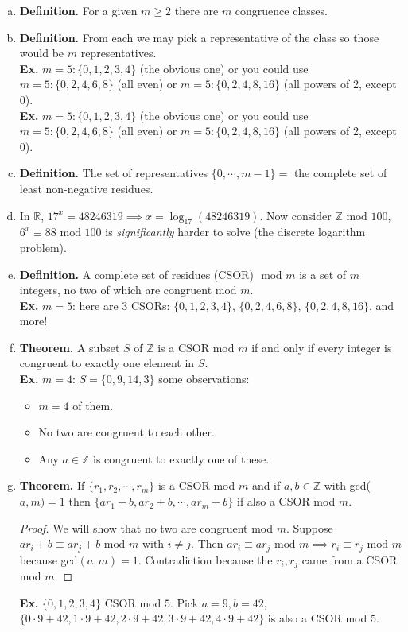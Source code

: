 \documentclass[class=article, crop=false]{standalone}
\def\reals{{\mathbb R}}
\def\integers{{\mathbb Z}}
\begin{document}
\begin{enumerate}[1.]
\begin{enumerate}[(a)]
		\item \textbf{Definition.} For a given $m\geq 2$ there are $m$ congruence classes.
		
		\item \textbf{Definition.} From each we may pick a representative of the class so those would be $m$
		representatives.\\ \textbf{Ex.} $m=5: \{0,1,2,3,4\}$ (the obvious one) or you could use $m=5: \{0,2,4,6,8\}$ (all even) 
		or $m=5:\{0,2,4,8,16\}$ (all powers of 2, except 0).\\
		\textbf{Ex.} $m=5: \{0,1,2,3,4\}$ (the obvious one) or you could use $m=5: \{0,2,4,6,8\}$ (all even) 
		or $m=5:\{0,2,4,8,16\}$ (all powers of 2, except 0).
		
		\item \textbf{Definition.} The set of representatives $\{0,\cdots,m-1\}=$ the complete set of least
		non-negative residues.

		\item[] 
		\noindent In $\reals$, $17^x = 48246319\implies x=\log_17(48246319)$. Now consider $\integers\mbox{ mod }100$,
		$6^x\equiv 88\mbox{ mod }100$ is \emph{significantly} harder to solve (the discrete logarithm problem).

		\item \textbf{Definition.} A complete set of residues (CSOR) $\mbox{ mod }m$ is a set of $m$ integers, no two of which
		are congruent mod $m$.\\
		\textbf{Ex.} $m=5$: here are 3 CSORs: $\{0,1,2,3,4\}$, $\{0,2,4,6,8\}$, $\{0,2,4,8,16\}$, and more!

		\item \textbf{Theorem.} A subset $S$ of $\integers$ is a CSOR mod $m$ if and only if every integer is
		congruent to exactly one element in $S$.\\
		\noindent\textbf{Ex.} $m=4$: $S=\{0,9,14,3\}$ some observations:
		\begin{itemize}
			\item $m=4$ of them.
			\item No two are congruent to each other.
			\item Any $a\in\integers$ is congruent to exactly one of these.
		\end{itemize}

		\item \textbf{Theorem.} If $\{r_1,r_2,\cdots, r_m\}$ is a CSOR mod $m$ and if $a,b\in\integers$ with 
		gcd($a,m)=1$ then $\{ar_1+b, ar_2+b,\cdots, ar_m+b\}$ if also a CSOR mod $m$.
		\begin{proof}
			We will show that no two are congruent mod $m$. Suppose $ar_i+b\equiv ar_j+b\mbox{ mod }m$ with
			$i\neq j$. Then $ar_i\equiv ar_j\mbox{ mod }m \implies r_i\equiv r_j\mbox{ mod }m$ because
			gcd$(a,m)=1$. Contradiction because the $r_i, r_j$ came from a CSOR mod $m$.
		\end{proof}
		\noindent\textbf{Ex.} $\{0,1,2,3,4\}$ CSOR mod $5$. Pick $a=9, b=42$,
		$\{0\cdot9 +42,1\cdot9 +42, 2\cdot9 +42, 3\cdot9 +42, 4\cdot9 +42\}$ is also a CSOR mod $5$.
	\end{enumerate}


\end{enumerate}
\end{document}
